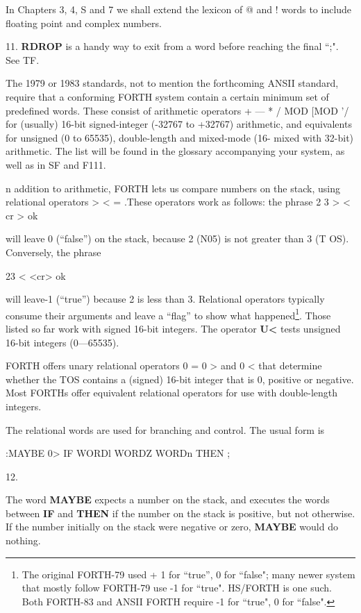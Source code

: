 \begin{itemize}
In Chapters 3, 4, S and 7 we shall extend the lexicon of @ and ! words to include floating point and complex numbers.

11. \textbf{RDROP} is a handy way to exit from a word before reaching the ﬁnal “;". See TF.


The 1979 or 1983 standards, not to mention the forthcoming ANSII standard, require that a conforming FORTH system contain a certain minimum set of predefined words. These consist of arithmetic operators + — * / MOD [MOD '/ for (usually) 16-bit signed-integer (-32767 to +32767) arithmetic, and equivalents for unsigned (0 to 65535), double-length and mixed-mode (16- mixed with 32-bit) arithmetic. The list will be found in the glossary accompanying your system, as well as in SF and F111.


n addition to arithmetic, FORTH lets us compare numbers on the stack, using relational operators > < = .These operators work as follows: the phrase
2 3 > < cr > ok

will leave 0 (“false”) on the stack, because 2 (N05) is not greater
than 3 (T OS). Conversely, the phrase

23 < <cr> ok

will leave-1 (“true”) because 2 is less than 3. Relational operators typically consume their arguments and leave a “ﬂag” to show what happened\footnote{ The original FORTH-79 used + 1 for “true”, 0 for “false"; many newer system that mostly follow FORTH-79 use -1 for “true". HS/FORTH is one such. Both FORTH-83 and ANSII FORTH require -1 for “true", 0 for “false".}. Those listed so far work with signed 16-bit integers. The operator \textbf{U<} tests unsigned 16-bit integers (0—65535).

FORTH offers unary relational operators 0 = 0 > and 0 < that determine whether the TOS contains a (signed) 16-bit integer that is 0, positive or negative. Most FORTHs offer equivalent relational operators for use with double-length integers.

The relational words are used for branching and control. The usual form is

:MAYBE 0> IF WORDl WORDZ
WORDn THEN ;

12.

The word \textbf{MAYBE} expects a number on the stack, and executes the words between \textbf{IF} and \textbf{THEN} if the number on the stack is positive, but not otherwise. If the number initially on the stack were negative or zero, \textbf{MAYBE} would do nothing.


\end{itemize}
